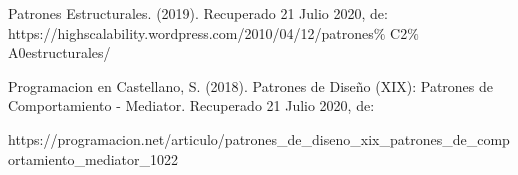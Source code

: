 \documentclass[12pt]{article}
\begin{document}
\begin{multicols}{2}
\vspace{\baselineskip}

\vspace{\baselineskip}
{\fontsize{9pt}{10.8pt}\selectfont Patrones Estructurales. (2019). Recuperado 21 Julio 2020, de: https://highscalability.wordpress.com/2010/04/12/patrones$\%$ C2$\%$ A0estructurales/ \par}\par


\vspace{\baselineskip}
{\fontsize{9pt}{10.8pt}\selectfont  \par}\par


\vspace{\baselineskip}
{\fontsize{9pt}{10.8pt}\selectfont Programacion en Castellano, S. (2018). Patrones de Diseño (XIX): Patrones de Comportamiento - Mediator. Recuperado 21 Julio 2020, de: \par}\par


\vspace{\baselineskip}
{\fontsize{9pt}{10.8pt}\selectfont https://programacion.net/articulo/patrones\_de\_diseno\_xix\_patrones\_de\_comportamiento\_mediator\_1022\par}\par


\vspace{\baselineskip}

\vspace{\baselineskip}
\vspace{\baselineskip}
\setlength{\parskip}{8.04pt}

\vspace{\baselineskip}

\vspace{\baselineskip}

\end{multicols}

\vspace{\baselineskip}

\vspace{\baselineskip}

\vspace{\baselineskip}

\printbibliography
\end{document}
